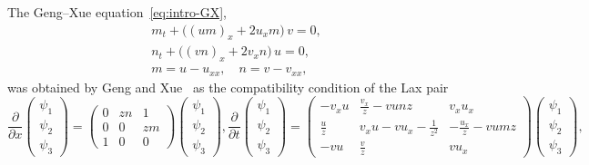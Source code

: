 \documentclass[10pt,a4paper]{article} \pdfoutput=1 
\begin{document}
The Geng--Xue equation~\eqref{eq:intro-GX},
\begin{equation}
  \label{eq:GX-again}
  \begin{gathered}
    m_t + \bigl( (u m)_x + 2 u_x m \bigr) \, v = 0
    , \\
    n_t + \bigl( (v n)_x + 2 v_x n \bigr) \, u = 0
    , \\
    m = u - u_{xx}
    ,\quad
    n = v - v_{xx}
    ,
  \end{gathered}
\end{equation}
was obtained by Geng and Xue~\cite{geng-xue:2009:GX-peakon-equation-cubic-nonlinearity}
as the compatibility condition of the Lax pair
\begin{subequations}
  \label{eq:GX-laxI}
  \begin{equation}
    \label{eq:GX-laxI-x}
    \frac{\partial}{\partial x}
    \begin{pmatrix} \psi_1 \\ \psi_2 \\ \psi_3 \end{pmatrix} =
    \begin{pmatrix}
      0 & zn & 1 \\
      0 & 0 & zm \\
      1 & 0 & 0
    \end{pmatrix}
    \begin{pmatrix} \psi_1 \\ \psi_2 \\ \psi_3 \end{pmatrix}
    ,
  \end{equation}
  \begin{equation}
    \label{eq:GX-laxI-t}
    \frac{\partial}{\partial t}
    \begin{pmatrix} \psi_1 \\ \psi_2 \\ \psi_3 \end{pmatrix} =
    \begin{pmatrix}
      -v_xu & \frac{v_x}{z}-vunz & v_xu_x \\
      \frac{u}{z} & v_xu - vu_x - \frac{1}{z^2} & - \frac{u_x}{z} - vumz \\
      -vu & \frac{v}{z} & vu_x
    \end{pmatrix}
    \begin{pmatrix} \psi_1 \\ \psi_2 \\ \psi_3 \end{pmatrix}
    ,
  \end{equation}
\end{subequations}
\end{document}

